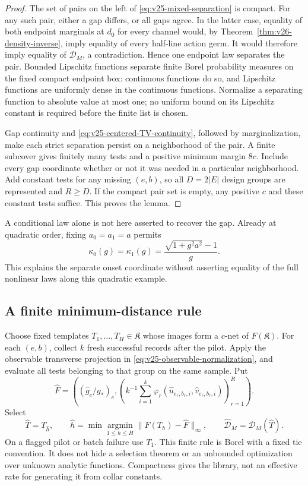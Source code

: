\begin{proof}
The set of pairs on the left of \eqref{eq:v25-mixed-separation} is compact.
For any such pair, either a gap differs, or all gaps agree.  In the latter
case, equality of both endpoint marginals at \(d_0\) for every channel
would, by Theorem~\ref{thm:v26-density-inverse}, imply equality of every
half-line action germ.  It would therefore imply equality of
\(\mathcal D_M\), a contradiction.  Hence one endpoint law separates the
pair.  Bounded Lipschitz functions separate finite Borel probability
measures on the fixed compact endpoint box: continuous functions do so,
and Lipschitz functions are uniformly dense in the continuous functions.
Normalize a separating function to absolute value at most one; no uniform
bound on its Lipschitz constant is required before the finite list is chosen.

Gap continuity and \eqref{eq:v25-centered-TV-continuity}, followed by
marginalization, make each strict separation persist on a neighborhood of
the pair.  A finite subcover gives finitely many tests and a positive minimum
margin \(8c\).  Include every gap coordinate whether or not it was needed
in a particular neighborhood.  Add constant tests for any missing
\((e,b)\), so all \(D=2|E|\) design groups are represented and \(R\ge D\).
If the compact pair set is empty, any positive \(c\) and these constant
tests suffice.  This proves the lemma.
\end{proof}

A conditional law alone is not here asserted to recover the gap.  Already
at quadratic order, fixing \(a_0=a_1=a\) permits
\[
 \kappa_0(g)=\kappa_1(g)=\frac{\sqrt{1+g^2a^2}-1}{g}.
\]
This explains the separate onset coordinate without asserting equality of
the full nonlinear laws along this quadratic example.

\subsection{A finite minimum-distance rule}

Choose fixed templates \(T_1,\ldots,T_H\in\mathfrak K\) whose images form
a \(c\)-net of \(F(\mathfrak K)\).  For each \((e,b)\), collect \(k\)
fresh successful records after the pilot.  Apply the observable transverse
projection in \eqref{eq:v25-observable-normalization}, and evaluate all tests
belonging to that group on the same sample.  Put
\[
 \widehat F=\left((\widehat g_e/g_*)_e,
   \left(k^{-1}\sum_{i=1}^k
      \varphi_r(\widehat u_{e_r,b_r,i},\widehat v_{e_r,b_r,i})
                                      \right)_{r=1}^R\right).
\]
Select
\begin{equation}\label{eq:v25-finite-estimator}
 \widehat T=T_{\widehat h},\qquad
 \widehat h=\min\operatorname*{argmin}_{1\le h\le H}
                       \|F(T_h)-\widehat F\|_\infty,\qquad
 \widehat{\mathcal D}_M=\mathcal D_M(\widehat T).
\end{equation}
On a flagged pilot or batch failure use \(T_1\).  This finite rule is Borel
with a fixed tie convention.  It does not hide a selection theorem or an
unbounded optimization over unknown analytic functions.  Compactness gives
the library, not an effective rate for generating it from collar constants.

